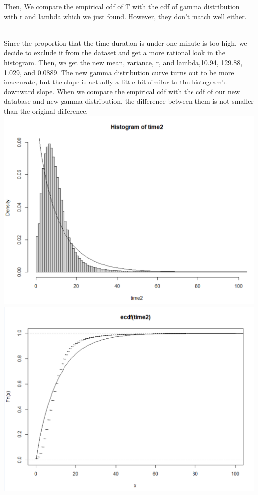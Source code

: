 \documentclass[11pt]{article}
\begin{document}
\par
Then, We compare the empirical cdf of T with the cdf of gamma distribution with r and lambda which we just found.
 However, they don’t match well either. \\

\\
\par
Since the proportion that the time duration is under one minute is too high, we decide to exclude it from the dataset
 and get a more rational look in the histogram. Then, we get the new mean, variance, r, and lambda,10.94, 129.88,
 1.029, and 0.0889. The new gamma distribution curve turns out to be more inaccurate, but the slope is actually a
 little bit similar to the histogram's downward slope. When we compare the empirical cdf with the cdf of our new
 database and new gamma distribution, the difference between them is not smaller than the original difference.\\
\includegraphics[scale = .30]{hist_p1_2.png}
\includegraphics[scale = .30]{cdf_p1_2.png}\\
\end{document}
